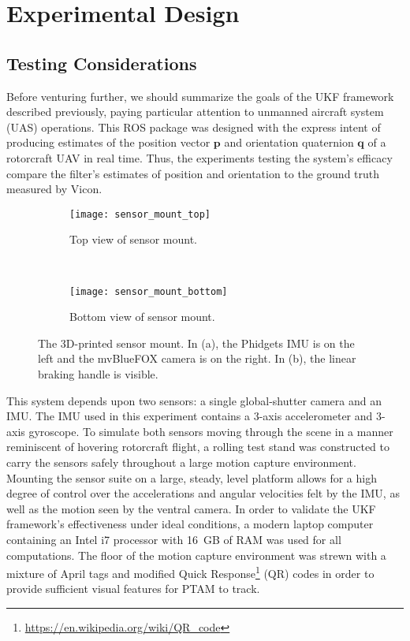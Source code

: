 \chapter{Experimental Design} \label{ch:Exp_Design}

\section{Testing Considerations}

Before venturing further, we should summarize the goals of the UKF framework described previously, paying particular attention to unmanned aircraft system (UAS) operations. This ROS package was designed with the express intent of producing estimates of the position vector $\mathbf{p}$ and orientation quaternion $\mathbf{q}$ of a rotorcraft UAV in real time. Thus, the experiments testing the system's efficacy compare the filter's estimates of position and orientation to the ground truth measured by Vicon.

\begin{figure}[t]
    \centering
    \begin{subfigure}[t]{0.5\textwidth}
        \centering
        \texttt{[image: sensor\_mount\_top]}
        \caption{Top view of sensor mount.}
    \end{subfigure}%
    ~ 
    \begin{subfigure}[t]{0.5\textwidth}
        \centering
        \texttt{[image: sensor\_mount\_bottom]}
        \caption{Bottom view of sensor mount.}
    \end{subfigure}
    \caption[3D-printed sensor mount]{The 3D-printed sensor mount. In (a), the Phidgets IMU is on the left and the mvBlueFOX camera is on the right. In (b), the linear braking handle is visible.}
    \label{fig:sensor_mount}
\end{figure}

This system depends upon two sensors: a single global-shutter camera and an IMU. The IMU used in this experiment contains a 3-axis accelerometer and 3-axis gyroscope. To simulate both sensors moving through the scene in a manner reminiscent of hovering rotorcraft flight, a rolling test stand was constructed to carry the sensors safely throughout a large motion capture environment. Mounting the sensor suite on a large, steady, level platform allows for a high degree of control over the accelerations and angular velocities felt by the IMU, as well as the motion seen by the ventral camera. In order to validate the UKF framework's effectiveness under ideal conditions, a modern laptop computer containing an Intel i7 processor with 16~GB of RAM was used for all computations. The floor of the motion capture environment was strewn with a mixture of April tags and modified Quick Response\footnote{\url{https://en.wikipedia.org/wiki/QR_code}} (QR) codes in order to provide sufficient visual features for PTAM to track.

